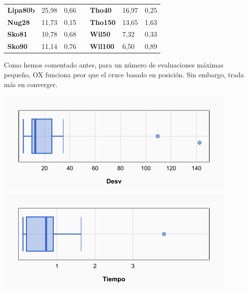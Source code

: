 \documentclass[a4paper, 12pt]{article}
\begin{document}
\begin{table}[H]
\begin{tabular}{|l|l|l|l|l|l|l|}
\textbf{Lipa80b}                    & 25,98                     & 0,66                        &                       & \textbf{Tho40}                     & 16,97                     & 0,25                        \\ \cline{1-3} \cline{5-7} 
\textbf{Nug28}                      & 11,73                     & 0,15                        &                       & \textbf{Tho150}                    & 13,65                     & 1,63                        \\ \cline{1-3} \cline{5-7} 
\textbf{Sko81}                      & 10,78                     & 0,68                        &                       & \textbf{Wil50}                     & 7,32                      & 0,33                        \\ \cline{1-3} \cline{5-7} 
\textbf{Sko90}                      & 11,14                     & 0,76                        &                       & \textbf{Wil100}                    & 6,50                      & 0,89                        \\ \cline{1-3} \cline{5-7} 
\end{tabular}
\end{table}

	Como hemos comentado antes, para un número de evaluaciones máximas pequeño, OX funciona peor que el cruce basado en posición. Sin embargo, trada más en converger.\\

	\begin{center}
         \includegraphics[scale=0.5]{boxplot-aggox-desv}
         \includegraphics[scale=0.5]{boxplot-aggox-time}
      \end{center}
      
\end{document}
